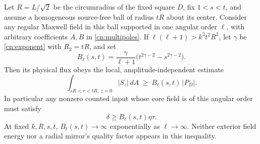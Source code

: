 \begin{theorem}
\label{cn:radial-bypass}
Let $R=L/\sqrt2$ be the circumradius of the fixed square $D$, fix
$1<s<t$, and assume a homogeneous source-free ball of radius $tR$
about its center.  Consider any regular Maxwell field in this ball
supported in one angular order $\ell$, with arbitrary coefficients
$A,B$ in \eqref{cn:multipoles}.  If
$\ell(\ell+1)>k^2t^2R^2$, let $\gamma$ be
\eqref{cn:exponent} with $R_2=tR$, and set
\begin{equation}\label{cn:bypass-constant}
 B_\ell(s,t)=\frac{\gamma}{\ell+1}
       \bigl(t^{2\gamma-2}-s^{2\gamma-2}\bigr).
\end{equation}
Then its physical flux obeys the local, amplitude-independent estimate
\begin{equation}\label{cn:bypass-bound}
 \int_{sR<r<tR,\ z=0}|S_z|\,dA
 \ \geq\ B_\ell(s,t)\,|P_D|.
\end{equation}
In particular any nonzero counted input whose core field is of this
angular order must satisfy
\begin{equation}\label{cn:counted-obstruction}
 \delta\geq B_\ell(s,t)\eta\tau.
\end{equation}
At fixed $k,R,s,t$, $B_\ell(s,t)\to\infty$ exponentially as
$\ell\to\infty$.  Neither exterior field energy nor a radial mirror's
quality factor appears in this inequality.
\end{theorem}
